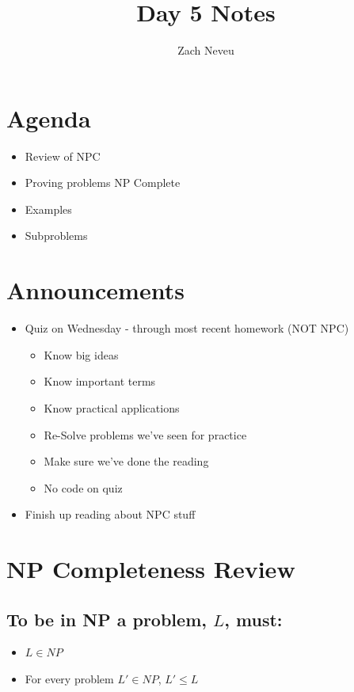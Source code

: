 \documentclass[12pt, letter]{article}
\author{Zach Neveu}
\title{ Day 5 Notes }
\begin{document}
\maketitle

\section{Agenda}%
\label{sec:agenda}
\begin{itemize}
	\item Review of NPC
	\item Proving problems NP Complete
	\item Examples
	\item Subproblems
\end{itemize}

\section{Announcements}%
\label{sec:announcements}
\begin{itemize}
	\item Quiz on Wednesday - through most recent homework (NOT NPC)
	\begin{itemize}
		\item Know big ideas
		\item Know important terms
		\item Know practical applications
		\item Re-Solve problems we've seen for practice
		\item Make sure we've done the reading
		\item No code on quiz
	\end{itemize}
	\item Finish up reading about NPC stuff
\end{itemize}

\section{NP Completeness Review}%
\label{sec:np_completeness_review}

\subsection*{To be in NP a problem, $L$, must:}
\begin{itemize}
	\item $L \in NP$
	\item For every problem $L' \in NP$, $L' \le L$
\end{itemize}
\end{document}
